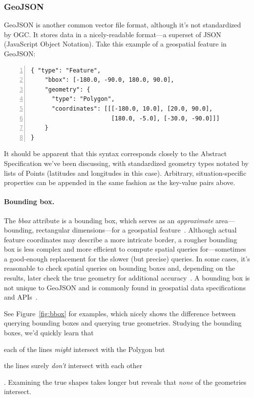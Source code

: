 \subsubsection{GeoJSON}
GeoJSON is another common vector file format, although it's not standardized by OGC. It stores data in a nicely-readable format---a superset of JSON (JavaScript Object Notation). Take this example of a geospatial feature in GeoJSON:

\begin{Verbatim}[samepage=true,baselinestretch=1,numbers=left,xleftmargin=12mm]
{ "type": "Feature",
    "bbox": [-180.0, -90.0, 180.0, 90.0],
    "geometry": {
      "type": "Polygon",
      "coordinates": [[[-180.0, 10.0], [20.0, 90.0],
                       [180.0, -5.0], [-30.0, -90.0]]]
    }
}
\end{Verbatim}

It should be apparent that this syntax corresponds closely to the Abstract Specification we've been discussing, with standardized geometry types notated by lists of Points (latitudes and longitudes in this case). Arbitrary, situation-specific properties can be appended in the same fashion as the key-value pairs above.

\paragraph{Bounding box.}
The \textit{bbox} attribute is a bounding box, which serves as an \textit{approximate} area---bounding, rectangular dimensions---for a geospatial feature~\cite{Boundless}. Although actual feature coordinates may describe a more intricate border, a rougher bounding box is less complex and more efficient to compute spatial queries for---sometimes a good-enough replacement for the slower (but precise) queries. In some cases, it's reasonable to check spatial queries on bounding boxes and, depending on the results, later check the true geometry for additional accuracy~\cite{Boundless}. A bounding box is not unique to GeoJSON and is commonly found in geospatial data specifications and APIs~\cite{Boundless}. 

See Figure~\ref{fig:bbox} for examples, which nicely shows the difference between querying bounding boxes and querying true geometries. Studying the bounding boxes, we'd quickly learn that \begin{enumerate*}[label=\itshape\alph*\upshape)]
\item each of the lines \textit{might} intersect with the Polygon but
\item the lines surely \textit{don't} intersect with each other
\end{enumerate*}. Examining the true shapes takes longer but reveals that \textit{none} of the geometries intersect.

